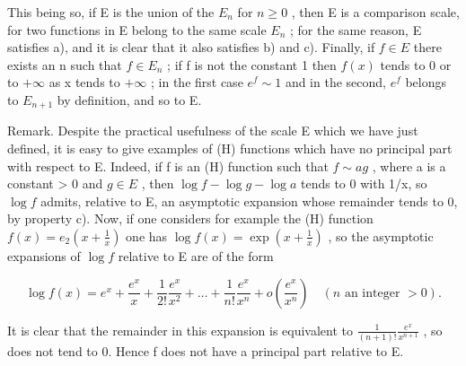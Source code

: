 This being so, if E is the union of the \(E_{n}\) for \(n \geqslant 0\) , then E is a comparison scale, for two functions in E belong to the same scale \(E_{n}\) ; for the same reason, E satisfies a), and it is clear that it also satisfies b) and c). Finally, if \(f \in E\) there exists an n such that \(f \in E_{n}\) ; if f is not the constant 1 then \(f(x)\) tends to 0 or to \(+\infty\) as x tends to \(+\infty\) ; in the first case \(e^{f} \sim 1\) and in the second, \(e^{f}\) belongs to \(E_{n+1}\) by definition, and so to E.

Remark. Despite the practical usefulness of the scale E which we have just defined, it is easy to give examples of (H) functions which have no principal part with respect to E. Indeed, if f is an (H) function such that \(f \sim ag\) , where a is a constant \textgreater{} 0 and \(g \in E\) , then \(\log f - \log g - \log a\) tends to 0 with 1/x, so \(\log f\) admits, relative to E, an asymptotic expansion whose remainder tends to 0, by property c). Now, if one considers for example the (H) function \(f(x) = e_{2}\left(x + \frac{1}{x}\right)\) one has \(\log f(x) = \exp\left(x + \frac{1}{x}\right)\) , so the asymptotic expansions of \(\log f\) relative to E are of the form

\[
\log f (x) = e ^ {x} + \frac {e ^ {x}}{x} + \frac {1}{2 !} \frac {e ^ {x}}{x ^ {2}} + \dots + \frac {1}{n !} \frac {e ^ {x}}{x ^ {n}} + o \left(\frac {e ^ {x}}{x ^ {n}}\right) \quad (n \text {   an   integer   } > 0).
\]

It is clear that the remainder in this expansion is equivalent to \(\frac{1}{(n+1)!}\frac{e^{x}}{x^{n+1}}\) , so does not tend to 0. Hence f does not have a principal part relative to E.

